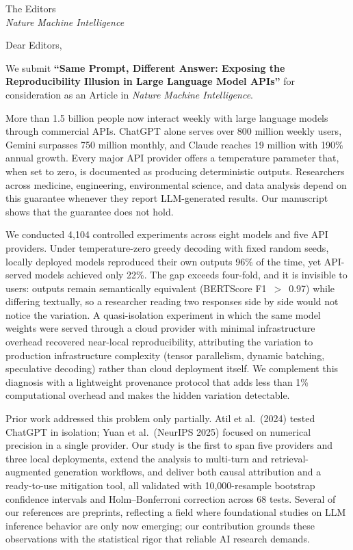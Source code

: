 \documentclass[11pt]{letter}
\begin{document}
\begin{letter}{The Editors\\
\textit{Nature Machine Intelligence}}

\opening{Dear Editors,}

We submit \textbf{``Same Prompt, Different Answer: Exposing the Reproducibility Illusion in Large Language Model APIs''} for consideration as an Article in \textit{Nature Machine Intelligence}.

More than 1.5 billion people now interact weekly with large language models through commercial APIs. ChatGPT alone serves over 800 million weekly users, Gemini surpasses 750 million monthly, and Claude reaches 19 million with 190\% annual growth. Every major API provider offers a temperature parameter that, when set to zero, is documented as producing deterministic outputs. Researchers across medicine, engineering, environmental science, and data analysis depend on this guarantee whenever they report LLM-generated results. Our manuscript shows that the guarantee does not hold.

We conducted 4,104 controlled experiments across eight models and five API providers. Under temperature-zero greedy decoding with fixed random seeds, locally deployed models reproduced their own outputs 96\% of the time, yet API-served models achieved only 22\%. The gap exceeds four-fold, and it is invisible to users: outputs remain semantically equivalent (BERTScore F1~$>$~0.97) while differing textually, so a researcher reading two responses side by side would not notice the variation. A quasi-isolation experiment in which the same model weights were served through a cloud provider with minimal infrastructure overhead recovered near-local reproducibility, attributing the variation to production infrastructure complexity (tensor parallelism, dynamic batching, speculative decoding) rather than cloud deployment itself. We complement this diagnosis with a lightweight provenance protocol that adds less than 1\% computational overhead and makes the hidden variation detectable.

Prior work addressed this problem only partially. Atil et al.\ (2024) tested ChatGPT in isolation; Yuan et al.\ (NeurIPS 2025) focused on numerical precision in a single provider. Our study is the first to span five providers and three local deployments, extend the analysis to multi-turn and retrieval-augmented generation workflows, and deliver both causal attribution and a ready-to-use mitigation tool, all validated with 10,000-resample bootstrap confidence intervals and Holm--Bonferroni correction across 68 tests. Several of our references are preprints, reflecting a field where foundational studies on LLM inference behavior are only now emerging; our contribution grounds these observations with the statistical rigor that reliable AI research demands.


\end{letter}
\end{document}
